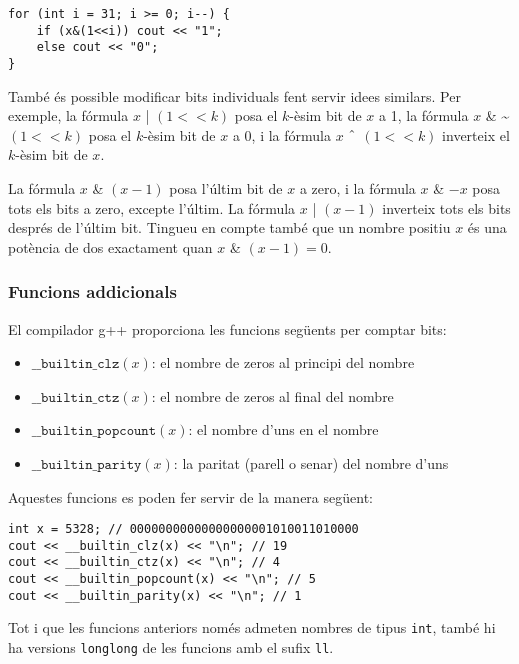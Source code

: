 \begin{lstlisting}
for (int i = 31; i >= 0; i--) {
    if (x&(1<<i)) cout << "1";
    else cout << "0";
}
\end{lstlisting}


També és possible modificar bits individuals fent servir idees
similars. Per exemple, la fórmula $x$ | $(1 < < k)$ posa el $k$-èsim
bit de $x$ a 1, la fórmula $x$ \& \textasciitilde $(1 < < k)$ posa el
$k$-èsim bit de $x$ a 0, i la fórmula $x$ $\XOR$ $(1 < < k)$
inverteix el $k$-èsim bit de $x$.

La fórmula $x$ \& $(x-1)$ posa l'últim bit de $x$ a zero, i la fórmula
$x$ \& $-x$ posa tots els bits a zero, excepte l'últim. La
fórmula $x$ | $(x-1)$ inverteix tots els bits després de l'últim
bit. Tingueu en compte també que un nombre positiu $x$ és una potència
de dos exactament quan $x$ \& $(x-1) = 0$.

\subsubsection*{Funcions addicionals}

El compilador g++ proporciona les funcions següents per comptar bits:


\begin{itemize}
\item
$\texttt{\_\_builtin\_clz}(x)$:
el nombre de zeros al principi del nombre
\item
$\texttt{\_\_builtin\_ctz}(x)$:
el nombre de zeros al final del nombre
\item
$\texttt{\_\_builtin\_popcount}(x)$:
el nombre d'uns en el nombre
\item
$\texttt{\_\_builtin\_parity}(x)$:
la paritat (parell o senar) del nombre d'uns
\end{itemize}

\begin{samepage}
Aquestes funcions es poden fer servir de la manera següent:
\begin{lstlisting}
int x = 5328; // 00000000000000000001010011010000
cout << __builtin_clz(x) << "\n"; // 19
cout << __builtin_ctz(x) << "\n"; // 4
cout << __builtin_popcount(x) << "\n"; // 5
cout << __builtin_parity(x) << "\n"; // 1
\end{lstlisting}
\end{samepage}

Tot i que les funcions anteriors només admeten nombres de tipus
\texttt{int}, també hi ha versions \texttt{longlong} de les funcions
amb el sufix \texttt{ll}.


